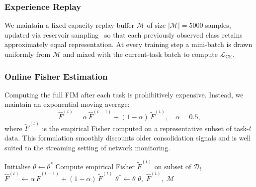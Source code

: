 \documentclass[journal,twoside]{IEEEtran}
\begin{document}
\subsubsection{Experience Replay}
We maintain a fixed-capacity replay buffer
$\mathcal{M}$ of size $|\mathcal{M}|=5000$ samples, updated via
reservoir sampling~\cite{vitter1985random} so that each previously
observed class retains approximately equal representation.  At every
training step a mini-batch is drawn uniformly from $\mathcal{M}$ and
mixed with the current-task batch to compute
$\mathcal{L}_{\mathrm{CE}}$.

\subsubsection{Online Fisher Estimation}
Computing the full FIM after each task is prohibitively expensive.
Instead, we maintain an exponential moving average:
\begin{equation}
  \hat{F}^{(t)}
  = \alpha\,\hat{F}^{(t-1)} + (1-\alpha)\,\tilde{F}^{(t)},
  \quad \alpha=0.5,
  \label{eq:fisher_ema}
\end{equation}
where $\tilde{F}^{(t)}$ is the empirical Fisher computed on a
representative subset of task-$t$ data.  This formulation smoothly
discounts older consolidation signals and is well suited to the
streaming setting of network monitoring.

\begin{algorithm}[t]
\DontPrintSemicolon
\SetAlgoLined
{}
Initialise $\theta \leftarrow \theta^{*}$\;
Compute empirical Fisher $\tilde{F}^{(t)}$ on subset of
$\mathcal{D}_t$\;
$\hat{F}^{(t)}\leftarrow\alpha\,\hat{F}^{(t-1)}
  +(1-\alpha)\,\tilde{F}^{(t)}$\;
$\theta^{*}\leftarrow\theta$\;
\Return $\theta,\;\hat{F}^{(t)},\;\mathcal{M}$\;
\caption{EWC with Experience Replay and Online Fisher Estimation}
\label{alg:ewc}
\end{algorithm}
\end{document}
